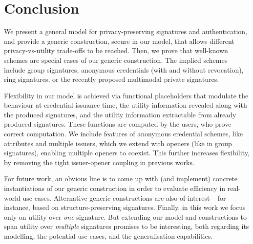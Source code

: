 \section{Conclusion}
\label{sec:conclusion}

We present a general model for privacy-preserving signatures and authentication,
and provide a generic construction, secure in our model, that allows
different privacy-vs-utility trade-offs to be reached.
%
Then, we prove that well-known schemes are special cases of our generic
construction. The implied schemes include group signatures, anonymous
credentials (with and without revocation), ring signatures, or the recently
proposed multimodal private signatures.

Flexibility in our model is achieved via functional placeholders that
modulate the behaviour at credential issuance time, the utility
information revealed along with the produced signatures, and the utility
information extractable from already produced signatures. These functions are
computed by the users, who prove correct computation. We include features of
anonymous credential schemes, like attributes and multiple
issuers, which we extend with openers (like in group signatures), enabling
multiple openers to coexist. This further increases flexibility, by removing
the tight issuer-opener coupling in previous works.

For future work, an obvious line is to come up with (and implement) concrete
instantiations of our generic construction in order to evaluate efficiency in
real-world use cases. Alternative generic constructions are also of interest --
for instance, based on structure-preserving signatures.
%
Finally, in this work we focus only on utility over \emph{one} signature. But
extending our model and constructions to span utility over \emph{multiple}
signatures promises to be interesting, both regarding its modelling, the
potential use cases, and the generalisation capabilities.


